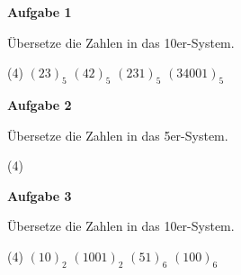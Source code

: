 \documentclass[a6paper, landscape]{scrartcl}
\begin{document}
\textbf{Aufgabe 1}\par
Übersetze die Zahlen in das 10er-System.
\begin{tasks}(4)
	\task $(23)_5$
	\task $(42)_5$
	\task $(231)_5$
	\task $(34001)_5$
\end{tasks}

\textbf{Aufgabe 2}\par
Übersetze die Zahlen in das 5er-System.
\begin{tasks}(4)
\end{tasks}

\textbf{Aufgabe 3}\par
Übersetze die Zahlen in das 10er-System.
\begin{tasks}(4)
	\task $(10)_2$
	\task $(1001)_2$
	\task $(51)_6$
	\task $(100)_6$
\end{tasks}
\end{document}
